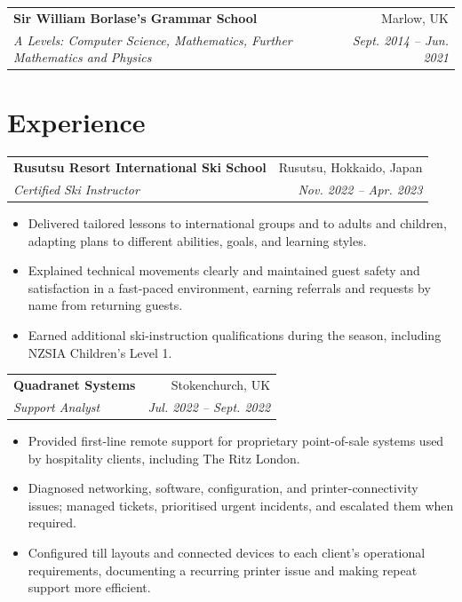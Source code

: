 \documentclass[a4paper,10pt]{article}
\makeatletter
\newcommand{\entry}[4]{%
  \begin{tabular*}{\textwidth}{@{}l@{\extracolsep{\fill}}r@{}}
    \textbf{#1} & #2 \\
    \textit{#3} & \textit{#4}
  \end{tabular*}\vspace{-1pt}
}
\newenvironment{cvitems}
  {\begin{itemize}[leftmargin=1.25em,itemsep=1.5pt,topsep=2pt,parsep=0pt,partopsep=0pt]}
  {\end{itemize}\vspace{2pt}}
\makeatother
\begin{document}
\entry{Sir William Borlase's Grammar School}{Marlow, UK}
  {A Levels: Computer Science, Mathematics, Further Mathematics and Physics}
  {Sept. 2014 -- Jun. 2021}

\section{Experience}
\entry{Rusutsu Resort International Ski School}{Rusutsu, Hokkaido, Japan}
  {Certified Ski Instructor}{Nov. 2022 -- Apr. 2023}
\begin{cvitems}
  \item Delivered tailored lessons to international groups and to adults and
    children, adapting plans to different abilities, goals, and learning styles.
  \item Explained technical movements clearly and maintained guest safety and
    satisfaction in a fast-paced environment, earning referrals and requests by
    name from returning guests.
  \item Earned additional ski-instruction qualifications during the season,
    including NZSIA Children's Level 1.
\end{cvitems}

\entry{Quadranet Systems}{Stokenchurch, UK}{Support Analyst}{Jul. 2022 -- Sept. 2022}
\begin{cvitems}
  \item Provided first-line remote support for proprietary point-of-sale systems
    used by hospitality clients, including The Ritz London.
  \item Diagnosed networking, software, configuration, and printer-connectivity
    issues; managed tickets, prioritised urgent incidents, and escalated them when
    required.
  \item Configured till layouts and connected devices to each client's operational
    requirements, documenting a recurring printer issue and making repeat support
    more efficient.
\end{cvitems}

\newpage
\thispagestyle{fancy}
\end{document}
